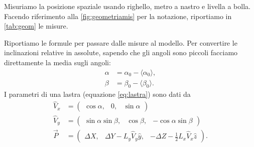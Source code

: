 Misuriamo la posizione spaziale usando righello, metro a nastro e livella a bolla.
Facendo riferimento alla \autoref{fig:geometriamis} per la notazione, riportiamo
in \autoref{tab:geom} le misure.

Riportiamo le formule per passare dalle misure al modello.
Per convertire le inclinazioni relative in assolute,
sapendo che gli angoli sono piccoli facciamo direttamente la media sugli angoli:
\begin{align*}
	\alpha &= \alpha_0 - \langle\alpha_0\rangle, \\
	\beta  &= \beta_0  - \langle\beta_0\rangle.
\end{align*}
I parametri di una lastra (equazione \ref{eq:lastra}) sono dati da
\begin{align*}
	\hat V_x &= \begin{pmatrix}
		\cos\alpha, & 0, & \sin\alpha
	\end{pmatrix} \\
	\hat V_y &= \begin{pmatrix}
		\sin\alpha\sin\beta, & \cos\beta, & -\cos\alpha\sin\beta
	\end{pmatrix} \\
	\vec P &= \begin{pmatrix}
		\Delta X, & \Delta Y - L_y\hat V_y\hat y, & -\Delta Z - \frac12 L_x\hat V_x\hat z
	\end{pmatrix}.
\end{align*}

